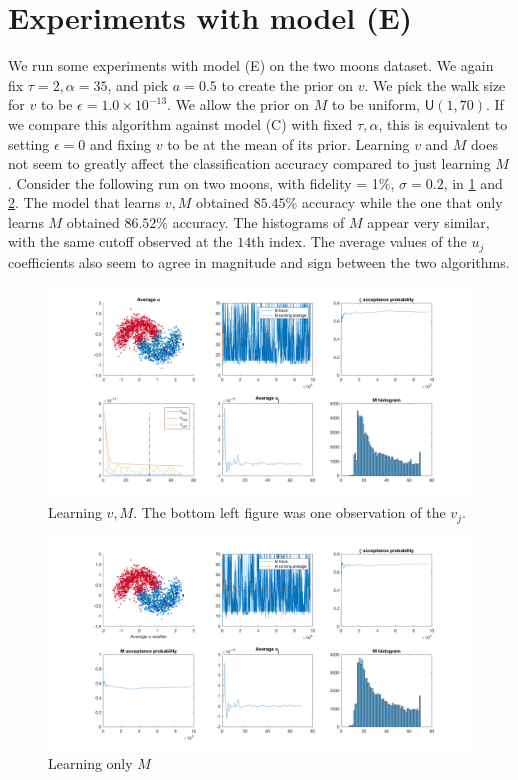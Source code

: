 \documentclass{siamart1116}
\begin{document}
\section{Experiments with model (E)}
    We run some experiments with model (E) on the two moons dataset. We again fix $\tau = 2, \alpha = 35$, and pick $a=0.5$ to create the prior on $v$. We pick the walk size for $v$ to be $\epsilon = 1.0\times 10^{-13}$. We allow the prior on $M$ to be uniform, $\mathsf{U}(1,70)$. If we compare this algorithm against model (C) with fixed $\tau, \alpha$, this is equivalent to setting $\epsilon = 0$ and fixing $v$ to be at the mean of its prior. Learning $v$ and $M$ does not seem to greatly affect the classification accuracy compared to just learning $M$. Consider the following run on two moons, with fidelity = 1\%, $\sigma = 0.2$, in \cref{fig:modelE_learn_v} and \cref{fig:modelE_fixed_v}. The model that learns $v, M$ obtained $85.45\%$ accuracy while the one that only learns $M$ obtained $86.52\%$ accuracy. The histograms of $M$ appear very similar, with the same cutoff observed at the $14$th index. The average values of the $u_j$ coefficients also seem to agree in magnitude and sign between the two algorithms.

    \begin{figure}
        \caption{\label{fig:modelE_learn_v}Learning $v, M$. The bottom left figure was one observation of the $v_j$.}
        \includegraphics[width=\linewidth]{learnv/v_uniform_prior/all.png}
    \end{figure}

    \begin{figure}
        \caption{\label{fig:modelE_fixed_v}Learning only $M$}
        \includegraphics[width=\linewidth]{learnv/v_fixed/all.png}
    \end{figure}
    
\end{document}

